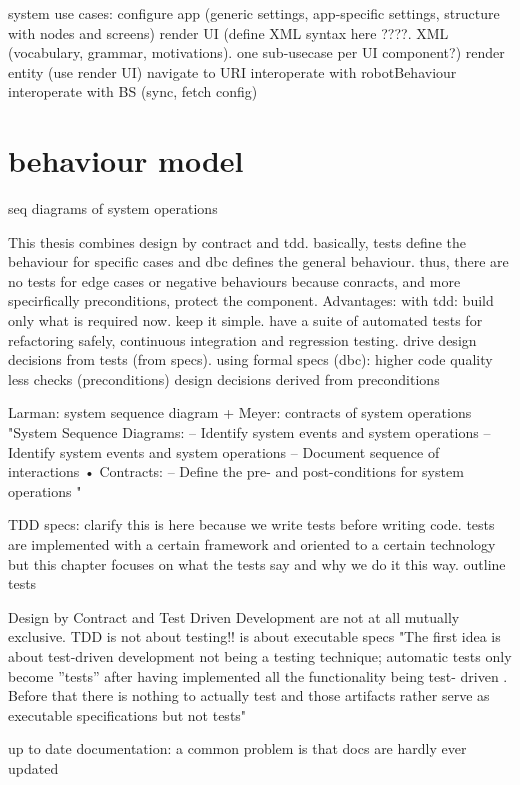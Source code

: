 system use cases:
configure app (generic settings, app-specific settings, structure with nodes and screens)
render UI (define XML syntax here ????. XML (vocabulary, grammar, motivations). one sub-usecase per UI component?)
render entity (use render UI)
navigate to URI
interoperate with robotBehaviour 
interoperate with BS (sync, fetch config)

\section{behaviour model}
seq diagrams of system operations

This thesis combines design by contract and tdd. basically, tests define the behaviour for specific cases and dbc defines the general behaviour. thus, there are no tests for edge cases or negative behaviours because conracts, and more specirfically preconditions, protect the component.
Advantages:
with tdd:
build only what is required now. keep it simple.
have a suite of automated tests for refactoring safely, continuous integration and regression testing.
drive design decisions from tests (from specs).
using formal specs (dbc):
higher code quality
less checks (preconditions)
design decisions derived from preconditions

Larman: system sequence diagram + Meyer: contracts of system operations
"System Sequence Diagrams:
–
Identify system events and system operations
–
Identify system events and system operations
– Document sequence of interactions
• Contracts:
– Define the pre- and post-conditions for system
operations "


TDD specs:
clarify this is here because we write tests before writing code. tests are implemented with a certain framework and oriented to a certain technology but this chapter focuses on what the tests say and why we do it this way.
outline tests


Design by Contract and Test Driven Development are not at all mutually exclusive.
TDD is not about testing!! is about executable specs
"The first idea is about test-driven development not being a testing technique;
automatic tests only become ”tests” after having implemented all the functionality
being test-
driven
. Before that there is nothing to actually
test
and those artifacts
rather serve as executable
specifications
but not tests"

up to date documentation: a common problem is that docs are hardly ever updated


